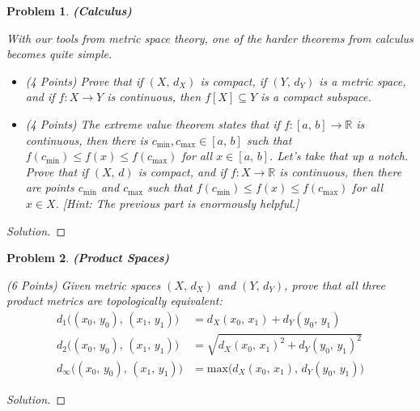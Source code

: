 \documentclass{article}
\theoremstyle{normal}
\newtheorem{problem}{Problem}
\begin{document}
    \begin{problem}
        \textbf{(Calculus)}
        \par\hfill\par
        With our tools from metric space theory, one of the harder theorems
        from calculus becomes quite simple.
        \begin{itemize}
            \item (4 Points) Prove that if $(X,\,d_{X})$ is compact, if
                $(Y,\,d_{Y})$ is a metric space, and if $f:X\rightarrow{Y}$ is
                continuous, then $f[X]\subseteq{Y}$ is a compact subspace.
            \item (4 Points) The extreme value theorem states that if
                $f:[a,\,b]\rightarrow\mathbb{R}$ is continuous, then there is
                $c_{\textrm{min}},c_{\textrm{max}}\in[a,\,b]$ such that
                $f(c_{\textrm{min}})\leq{f}(x)\leq{f}(c_{\textrm{max}})$ for
                all $x\in[a,\,b]$. Let's take that up a notch. Prove that if
                $(X,\,d)$ is compact, and if $f:X\rightarrow\mathbb{R}$ is
                continuous, then there are points $c_{\textrm{min}}$ and
                $c_{\textrm{max}}$ such that
                $f(c_{\textrm{min}})\leq{f}(x)\leq{f}(c_{\textrm{max}})$ for
                all $x\in{X}$. [Hint: The previous part is enormously helpful.]
        \end{itemize}
    \end{problem}
    \color{black}
    \begin{proof}[Solution]
    \end{proof}
    \newpage
    \color{blue}
    \begin{problem}
        \textbf{(Product Spaces)}
        \par\hfill\par
        (6 Points) Given metric spaces $(X,\,d_{X})$
        and $(Y,\,d_{Y})$, prove that all three product metrics are
        topologically equivalent:
        \begin{align}
            d_{1}\big((x_{0},\,y_{0}),\,(x_{1},\,y_{1})\big)
                &=d_{X}(x_{0},\,x_{1})+d_{Y}(y_{0},\,y_{1})\\
            d_{2}\big((x_{0},\,y_{0}),\,(x_{1},\,y_{1})\big)
                &=\sqrt{d_{X}(x_{0},\,x_{1})^{2}+d_{Y}(y_{0},\,y_{1})^{2}}\\
            d_{\infty}\big((x_{0},\,y_{0}),\,(x_{1},\,y_{1})\big)
                &=\textrm{max}\big(%
                    d_{X}(x_{0},\,x_{1}),\,d_{Y}(y_{0},\,y_{1})
                \big)
        \end{align}
    \end{problem}
    \color{black}
    \begin{proof}[Solution]
    \end{proof}
\end{document}
